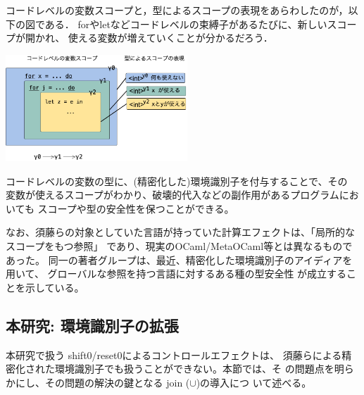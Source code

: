 コードレベルの変数スコープと，型によるスコープの表現をあらわしたのが，以下の図である．
forやletなどコードレベルの束縛子があるたびに、新しいスコープが開かれ、
使える変数が増えていくことが分かるだろう．
\begin{center}
  \includegraphics[clip,height=4cm]{./img/ec_for.png}
\end{center}

コードレベルの変数の型に、(精密化した)環境識別子を付与することで、その
変数が使えるスコープがわかり、破壊的代入などの副作用があるプログラムにおいても
スコープや型の安全性を保つことができる。

なお、須藤らの対象としていた言語が持っていた計算エフェクトは、「局所的なスコープをもつ参照」
であり、現実のOCaml/MetaOCaml等とは異なるものであった。
同一の著者グループは、最近、精密化した環境識別子のアイディアを用いて、
グローバルな参照を持つ言語に対するある種の型安全性
が成立することを示している\cite{Aplas2016}。

\subsection{本研究: 環境識別子の拡張}

本研究で扱う shift0/reset0によるコントロールエフェクトは、
須藤らによる精密化された環境識別子でも扱うことができない。本節では、そ
の問題点を明らかにし、その問題の解決の鍵となる join ($\cup$)の導入につ
いて述べる。

